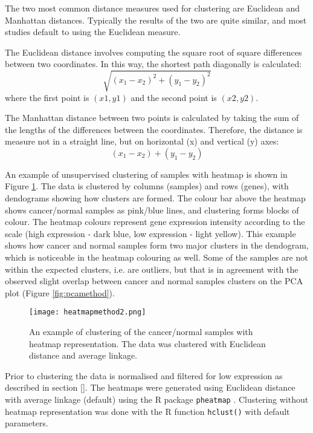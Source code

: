     
    The two most common distance measures used for clustering are Euclidean and Manhattan distances. Typically the results of the two are quite similar, and most studies default to using the Euclidean measure. 
    
    The Euclidean distance involves computing the square root of square differences between two coordinates. In this way, the shortest path diagonally is calculated: $$ \sqrt{(x_{1}-x_{2})^{2}+(y_{1}-y_{2})^{2}}$$ where the first point is $(x1, y1)$ and the second point is $(x2, y2).$
    
    The Manhattan distance between two points is calculated by taking the sum of the lengths of the differences between the coordinates. Therefore, the distance is measure not in a straight line, but on horizontal (x) and vertical (y) axes: $$ (x_{1}-x_{2})+(y_{1}-y_{2})$$
    
    \newpage
   An example of unsupervised clustering of samples with heatmap is shown in Figure \ref{fig:heatmapmethod}. The data is clustered by columns (samples) and rows (genes), with dendograms showing how clusters are formed. The colour bar above the heatmap shows cancer/normal samples as pink/blue lines, and clustering forms blocks of colour. The heatmap colours  represent gene expression intensity according to the scale (high expression - dark blue, low expression - light yellow). 
   This example shows how cancer and normal samples form two major clusters in the dendogram, which is noticeable in the heatmap colouring as well. Some of the samples are not within the expected clusters, i.e. are outliers, but that is in agreement with the observed  slight overlap between cancer and normal samples clusters on the PCA plot (Figure \ref{fig:pcamethod}).

        \begin{figure}[h]
        \centering
        \texttt{[image: heatmapmethod2.png]}
        \caption{An example of clustering of the cancer/normal samples with heatmap representation. The data was clustered with Euclidean distance and average linkage. }
        \label{fig:heatmapmethod}
        \end{figure}
    
    Prior to clustering the data is normalised and filtered for low expression as described in  section \ref{}. The heatmaps were generated using Euclidean distance with average linkage (default) using the R package  \texttt{pheatmap} \cite{kolde2012pheatmap}. Clustering without heatmap representation was done with the R function \texttt{hclust()} with default parameters.



